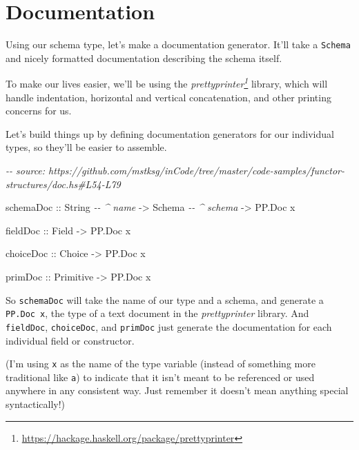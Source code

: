 \documentclass[]{article}
\newenvironment{Shaded}{}{}
\newcommand{\CommentTok}[1]{\textcolor[rgb]{0.38,0.63,0.69}{\textit{#1}}}
\newcommand{\DataTypeTok}[1]{\textcolor[rgb]{0.56,0.13,0.00}{#1}}
\newcommand{\NormalTok}[1]{#1}
\newcommand{\OtherTok}[1]{\textcolor[rgb]{0.00,0.44,0.13}{#1}}
\renewcommand{\href}[2]{#2\footnote{\url{#1}}}
\begin{document}
\hypertarget{documentation}{%
\section{Documentation}\label{documentation}}

Using our schema type, let's make a documentation generator. It'll take a
\texttt{Schema} and nicely formatted documentation describing the schema itself.

To make our lives easier, we'll be using the
\emph{\href{https://hackage.haskell.org/package/prettyprinter}{prettyprinter}}
library, which will handle indentation, horizontal and vertical concatenation,
and other printing concerns for us.

Let's build things up by defining documentation generators for our individual
types, so they'll be easier to assemble.

\begin{Shaded}
\begin{Highlighting}[]
\CommentTok{{-}{-} source: https://github.com/mstksg/inCode/tree/master/code{-}samples/functor{-}structures/doc.hs\#L54{-}L79}

\NormalTok{schemaDoc}
\OtherTok{    ::} \DataTypeTok{String}       \CommentTok{{-}{-} \^{} name}
    \OtherTok{{-}>} \DataTypeTok{Schema}       \CommentTok{{-}{-} \^{} schema}
    \OtherTok{{-}>} \DataTypeTok{PP.Doc}\NormalTok{ x}

\OtherTok{fieldDoc ::} \DataTypeTok{Field} \OtherTok{{-}>} \DataTypeTok{PP.Doc}\NormalTok{ x}

\OtherTok{choiceDoc ::} \DataTypeTok{Choice} \OtherTok{{-}>} \DataTypeTok{PP.Doc}\NormalTok{ x}

\OtherTok{primDoc ::} \DataTypeTok{Primitive} \OtherTok{{-}>} \DataTypeTok{PP.Doc}\NormalTok{ x}
\end{Highlighting}
\end{Shaded}

So \texttt{schemaDoc} will take the name of our type and a schema, and generate
a \texttt{PP.Doc\ x}, the type of a text document in the \emph{prettyprinter}
library. And \texttt{fieldDoc}, \texttt{choiceDoc}, and \texttt{primDoc} just
generate the documentation for each individual field or constructor.

(I'm using \texttt{x} as the name of the type variable (instead of something
more traditional like \texttt{a}) to indicate that it isn't meant to be
referenced or used anywhere in any consistent way. Just remember it doesn't mean
anything special syntactically!)
\end{document}
